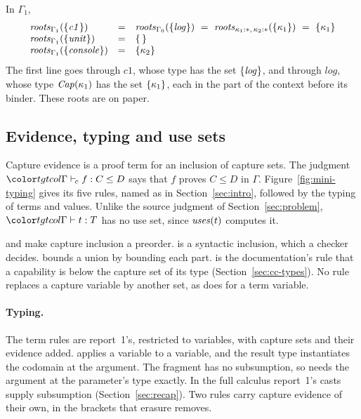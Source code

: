 \begin{example}\label{ex:mini-roots}
In $\Gamma_1$,
\[
\begin{array}{@{}lcl@{}}
\roots{\Gamma_1}{\cset{\mathit{c1}}} & = & \roots{\Gamma_0}{\cset{\mathit{log}}} \ = \ \roots{\kappa_1 : \cstar,\, \kappa_2 : \cstar}{\cset{\kappa_1}} \ = \ \cset{\kappa_1} \\
\roots{\Gamma_1}{\cset{\mathit{unit}}} & = & \cempty \\
\roots{\Gamma_1}{\cset{\mathit{console}}} & = & \cset{\kappa_2}
\end{array}
\]
The first line goes through $\mathit{c1}$, whose type has the set $\{\mathit{log}\}$, and through $\mathit{log}$, whose type $\mathit{Cap}(\kappa_1)$ has the set $\{\kappa_1\}$, each in the part of the context before its binder. These roots are on paper.
\end{example}

\FloatBarrier
\subsection{Evidence, typing and use sets}\label{sec:mini-typing}

Capture evidence is a proof term for an inclusion of capture sets. The judgment $\clej{\Gamma}{f}{C}{D}$ says that $f$ proves $C \le D$ in $\Gamma$. Figure~\ref{fig:mini-typing} gives its five rules, named as in Section~\ref{sec:intro}, followed by the typing of terms and values. Unlike the source judgment of Section~\ref{sec:problem}, $\tmj{\Gamma}{t}{T}$ has no use set, since $\mathit{uses}(t)$ computes it.

 and  make capture inclusion a preorder.  is a syntactic inclusion, which a checker decides.  bounds a union by bounding each part.  is the documentation's rule that a capability is below the capture set of its type (Section~\ref{sec:cc-types}). No rule replaces a capture variable by another set, as  does for a term variable.

\paragraph{Typing.}
The term rules are report~1's, restricted to variables, with capture sets and their evidence added.  applies a variable to a variable, and the result type instantiates the codomain at the argument. The fragment has no subsumption, so  needs the argument at the parameter's type exactly. In the full calculus report~1's casts supply subsumption (Section~\ref{sec:recap}). Two rules carry capture evidence of their own, in the brackets that erasure removes.

